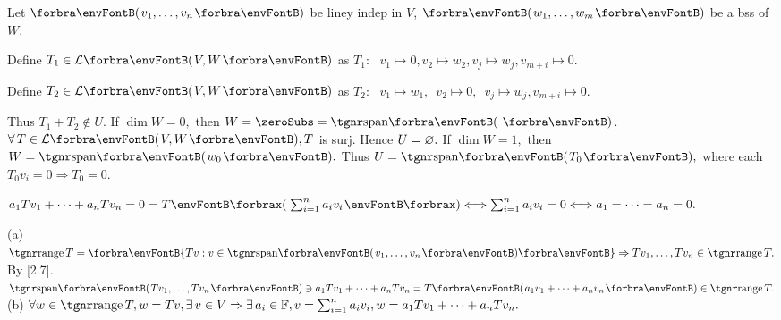\par\quad
Let $\Par{v_1,\dots,v_n}$ be liney indep in $V$, $\Par{w_1,\dots,w_m}$ be a bss of $W$. \par\quad
Define $T_1\in\Lm{V,W}$ as $T_1:\,\,\,\,v_1\mapsto 0,$\qquad$v_2\mapsto w_2,$\qquad$v_j\mapsto w_j,$\qquad$v_{m+i}\mapsto 0.$\par\quad
Define $T_2\in\Lm{V,W}$ as $T_2:\,\,\,\,v_1\mapsto w_1,$\,\,\,\quad$v_2\mapsto 0,$\,\,\,\qquad$v_j\mapsto w_j,$\qquad$v_{m+i}\mapsto 0.$\par\quad
{} Thus $T_1+T_2\not\in U.$\PfEnd\vspace{2pt}
\AComm If $\dim W=0,$ then $W=\zeroSubs=\Span{\,}$. $\forall\,T\in\Lm{V,W}, T$ is surj. Hence $U=\varnothing.$\parCom
If $\dim W=1,$ then $W=\Span{w_0}.$ Thus $U=\Span{T_0},$ where each $T_0v_i=0\Rightarrow T_0=0.$\SepLine\pagebreak

$a_1 Tv_1+\dots+a_n Tv_n=0=T\XPar{\sum_{i=1}^n a_i v_i}\Longleftrightarrow \sum_{i=1}^n a_i v_i=0\Longleftrightarrow a_1=\dots=a_n=0.$\PfEnd
\SepLine

 {
}(a) $\range T=\Bra{Tv:v\in\Span{v_1,\dots,v_n}}\Rightarrow Tv_1,\dots,Tv_n\in\range T.$ By [2.7].\parSol{\Ha}
\Or $\Span{Tv_1,\dots,Tv_n}\ni a_1 Tv_1+\dots+a_n Tv_n=T\Par{a_1 v_1+\dots+a_n v_n}\in\range T.$\parSol{}
(b) $\forall w\in\range T,w=Tv,\exists\,v\in V\Rightarrow\exists\,a_i\in\Fbb,v=\sum_{i=1}^na_i v_i,w=a_1 Tv_1+\dots+a_n Tv_n.$\PfEnd
\SepLine


